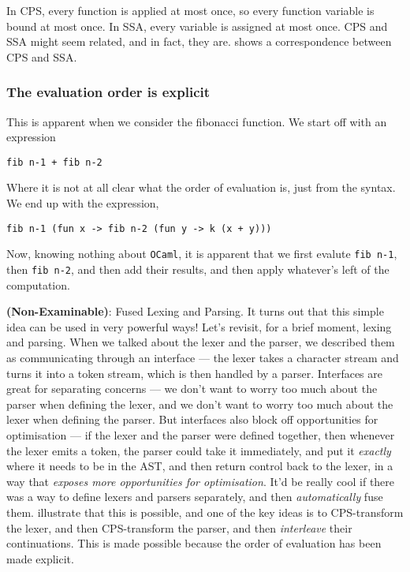 In CPS, every function is applied at most once, so every function variable is bound at most once. In SSA, every variable is assigned at most once. CPS and SSA might seem related, and in fact, they are. \citet{kelsey-1995} shows a correspondence between CPS and SSA. 

\subsubsection{The evaluation order is explicit}
This is apparent when we consider the fibonacci function. We start off with an expression
\begin{verbatim}
fib n-1 + fib n-2
\end{verbatim}
Where it is not at all clear what the order of evaluation is, just from the syntax. We end up with the expression,
\begin{verbatim}
fib n-1 (fun x -> fib n-2 (fun y -> k (x + y))) 
\end{verbatim}
Now, knowing nothing about \texttt{OCaml}, it is apparent that we first evalute \texttt{fib n-1}, then \texttt{fib n-2}, and then add their results, and then apply whatever's left of the computation. 

{\sffamily \textbf{(Non-Examinable)}: Fused Lexing and Parsing.} It turns out that this simple idea can be used in very powerful ways! Let's revisit, for a brief moment, lexing and parsing. When we talked about the lexer and the parser, we described them as communicating through an interface --- the lexer takes a character stream and turns it into a token stream, which is then handled by a parser. Interfaces are great for separating concerns --- we don't want to worry too much about the parser when defining the lexer, and we don't want to worry too much about the lexer when defining the parser. But interfaces also block off opportunities for optimisation --- if the lexer and the parser were defined together, then whenever the lexer emits a token, the parser could take it immediately, and put it \emph{exactly} where it needs to be in the AST, and then return control back to the lexer, in a way that \textit{exposes more opportunities for optimisation}. It'd be really cool if there was a way to define lexers and parsers separately, and then \emph{automatically} fuse them. \citet{yallop-2023} illustrate that this is possible, and one of the key ideas is to CPS-transform the lexer, and then CPS-transform the parser, and then \emph{interleave} their continuations. This is made possible because the order of evaluation has been made explicit. 


